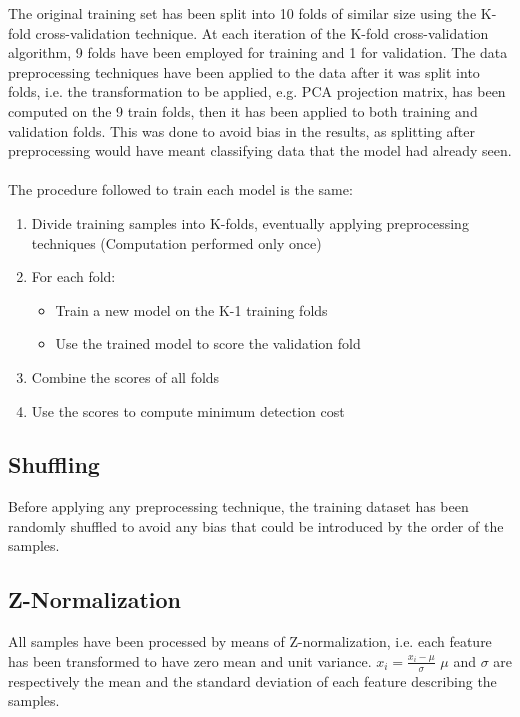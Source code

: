 \documentclass[12pt,a4paper]{article}
\begin{document}
The original training set has been split into 10 folds of similar size using the K-fold cross-validation technique.
At each iteration of the K-fold cross-validation algorithm, 9 folds have been employed for training and 1 for validation.
The data preprocessing techniques have been applied to the data after it was split into folds,
i.e. the transformation to be applied, e.g. PCA projection matrix, has been computed on the 9 train folds, then it has been applied to both training and validation folds.
This was done to avoid bias in the results, as splitting after preprocessing would have meant classifying data that the model had already seen.
\\ \\The procedure followed to train each model is the same:
\begin{enumerate}
    \item Divide training samples into K-folds, eventually applying preprocessing techniques (Computation performed only once)
    \item For each fold:
          \begin{itemize}
              \item Train a new model on the K-1 training folds
              \item Use the trained model to score the validation fold
          \end{itemize}
    \item Combine the scores of all folds
    \item Use the scores to compute minimum detection cost
\end{enumerate}

\subsection{Shuffling}

Before applying any preprocessing technique, the training dataset has been randomly shuffled to avoid any bias that could be introduced by the order of the samples.

\subsection{Z-Normalization}

All samples have been processed by means of Z-normalization, i.e. each feature has been transformed to have zero mean and unit variance.
$ x_i = \frac{x_i - \mu}{\sigma} $
$\mu$ and $\sigma$ are respectively the mean and the standard deviation of each feature describing the samples.
\end{document}
